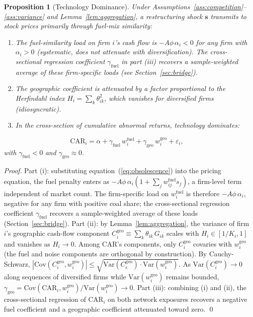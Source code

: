 \documentclass[12pt,a4paper]{article}
\newtheorem{proposition}{Proposition}
\begin{document}
\begin{proposition}[Technology Dominance]\label{prop:tech_dominance}
    Under Assumptions~\ref{ass:competition}--\ref{ass:variance} and Lemma~\ref{lem:aggregation}, a restructuring shock $\mathbf{s}$ transmits to stock prices primarily through fuel-mix similarity:
    \begin{enumerate}
        \item[(i)] The fuel-similarity load on firm $i$'s cash flow is $-A\phi\,\alpha_i < 0$ for any firm with $\alpha_i > 0$ (systematic, does not attenuate with diversification). The cross-sectional regression coefficient $\gamma_{\mathrm{fuel}}$ in part (iii) recovers a sample-weighted average of these firm-specific loads (see Section~\ref{sec:bridge}).
        \item[(ii)] The geographic coefficient is attenuated by a factor proportional to the Herfindahl index $H_i = \sum_k \theta_{ik}^2$, which vanishes for diversified firms (idiosyncratic).
        \item[(iii)] In the cross-section of cumulative abnormal returns, technology dominates:
    \end{enumerate}
    \begin{equation}\label{eq:reduced_form}
        \mathrm{CAR}_i = \alpha + \gamma_{\mathrm{fuel}}\, w^{\mathrm{fuel}}_i + \gamma_{\mathrm{geo}}\, w^{\mathrm{geo}}_i + \varepsilon_i,
    \end{equation}
    with $\gamma_{\mathrm{fuel}} < 0$ and $\gamma_{\mathrm{geo}} \approx 0$.
\end{proposition}

\begin{proof}
    Part (i): substituting equation~(\ref{eq:obsolescence}) into the pricing equation, the fuel penalty enters as $-A\phi\,\alpha_i(1 + \sum_j w^{\mathrm{fuel}}_{ij} s_j)$, a firm-level term independent of market count. The firm-specific load on $w^{\mathrm{fuel}}_i$ is therefore $-A\phi\,\alpha_i$, negative for any firm with positive coal share; the cross-sectional regression coefficient $\gamma_{\mathrm{fuel}}$ recovers a sample-weighted average of these loads (Section~\ref{sec:bridge}). Part (ii): by Lemma~\ref{lem:aggregation}, the variance of firm $i$'s geographic cash-flow component $C^{\mathrm{geo}}_i \equiv \sum_k \theta_{ik}\, G_{ik}$ scales with $H_i \in [1/K_i, 1]$ and vanishes as $H_i \to 0$. Among CAR's components, only $C^{\mathrm{geo}}_i$ covaries with $w^{\mathrm{geo}}_i$ (the fuel and noise components are orthogonal by construction). By Cauchy-Schwarz, $|\mathrm{Cov}(C^{\mathrm{geo}}_i, w^{\mathrm{geo}}_i)| \leq \sqrt{\mathrm{Var}(C^{\mathrm{geo}}_i)\cdot\mathrm{Var}(w^{\mathrm{geo}}_i)}$. As $\mathrm{Var}(C^{\mathrm{geo}}_i) \to 0$ along sequences of diversified firms while $\mathrm{Var}(w^{\mathrm{geo}}_i)$ remains bounded, $\gamma_{\mathrm{geo}} = \mathrm{Cov}(\mathrm{CAR}_i, w^{\mathrm{geo}}_i)/\mathrm{Var}(w^{\mathrm{geo}}_i) \to 0$. Part (iii): combining (i) and (ii), the cross-sectional regression of $\mathrm{CAR}_i$ on both network exposures recovers a negative fuel coefficient and a geographic coefficient attenuated toward zero. \qed
\end{proof}
\end{document}
